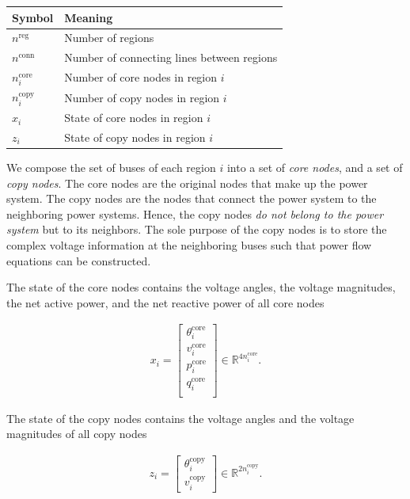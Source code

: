 \documentclass{article}
\newcommand{\n}{n}
\newcommand{\nregions}{\n^{\text{reg}}}
\newcommand{\nconnections}{\n^{\text{conn}}}
\newcommand{\ncore}{\n^\text{core}}
\newcommand{\ncopy}{\n^\text{copy}}
\newcommand{\stateCore}{x}
\newcommand{\stateCopy}{z}
\begin{document}
\begin{center}
    \begin{tabular}{ll}
        \toprule
        Symbol & Meaning \\
        \midrule
        $\nregions$ & Number of regions \\
        $\nconnections$ & Number of connecting lines between regions \\
        $\ncore_{i}$ & Number of core nodes in region $i$ \\
        $\ncopy_{i}$ & Number of copy nodes in region $i$ \\
        \midrule
        $\stateCore_{i}$ & State of core nodes in region $i$ \\
        $\stateCopy_{i}$ & State of copy nodes in region $i$ \\
        \bottomrule
    \end{tabular}
\end{center}

We compose the set of buses of each region $i$ into a set of \emph{core nodes}, and a set of \emph{copy nodes}.
The core nodes are the original nodes that make up the power system.
The copy nodes are the nodes that connect the power system to the neighboring power systems.
Hence, the copy nodes \emph{do not belong to the power system} but to its neighbors.
The sole purpose of the copy nodes is to store the complex voltage information at the neighboring buses such that power flow equations can be constructed.

The state of the core nodes contains the voltage angles, the voltage magnitudes, the net active power, and the net reactive power of all core nodes

\begin{align}
    \label{eq:state-core}
    \stateCore_i = \begin{bmatrix}
        \theta_i^\text{core} \\
        v_i^\text{core} \\
        p_i^\text{core} \\
        q_i^\text{core} \\
    \end{bmatrix}
    \in \mathbb{R}^{4 \ncore_i}.
\end{align}

The state of the copy nodes contains the voltage angles and the voltage magnitudes of all copy nodes

\begin{align}
    \label{eq:state-copy}
    \stateCopy_i = \begin{bmatrix}
        \theta_i^\text{copy} \\
        v_i^\text{copy}
    \end{bmatrix}
    \in \mathbb{R}^{2 \ncopy_i}.
\end{align}
\end{document}
